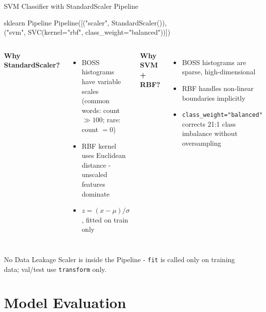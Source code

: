 \documentclass[aspectratio=169, 11pt]{beamer}
\begin{document}
\begin{frame}{SVM Classifier with StandardScaler Pipeline}
  \begin{block}{sklearn Pipeline}
    \small\ttfamily
    Pipeline([("scaler", StandardScaler()),\\
    \hspace{2.2em}("svm", SVC(kernel="rbf", class\_weight="balanced"))])
  \end{block}  %

  \vspace{0.4em}
  \begin{columns}[T]
      \small
      \textbf{Why StandardScaler?}
      \begin{itemize}
        \item BOSS histograms have variable scales\\
          (common words: count $\gg 100$; rare: count $= 0$)
        \item RBF kernel uses Euclidean distance -
          unscaled features dominate
        \item $z = (x - \mu)/\sigma$, fitted on train only
      \end{itemize}
      \small
      \textbf{Why SVM + RBF?}
      \begin{itemize}
        \item BOSS histograms are sparse, high-dimensional
        \item RBF handles non-linear boundaries implicitly
        \item \texttt{class\_weight="balanced"} corrects
          21:1 class imbalance without oversampling
      \end{itemize}
  \end{columns}

  \vspace{0.3em}
  \begin{alertblock}{No Data Leakage}
    \small
    Scaler is inside the Pipeline - \texttt{fit} is called only on
    training data; val/test use \texttt{transform} only.
  \end{alertblock}
\end{frame}

\section{Model Evaluation}
\end{document}
